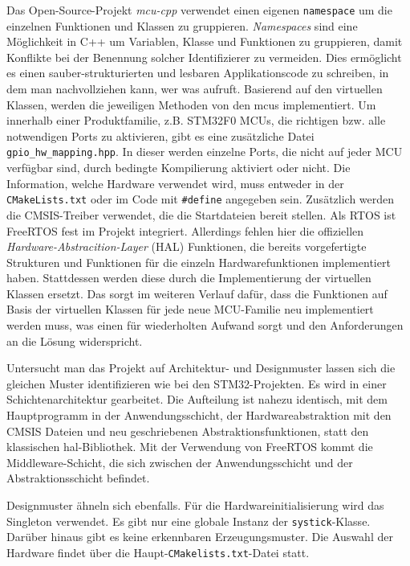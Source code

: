 Das Open-Source-Projekt \emph{mcu-cpp} verwendet einen eigenen \texttt{namespace} um die einzelnen Funktionen und Klassen zu gruppieren.
\emph{Namespaces} sind eine Möglichkeit in C++ um Variablen, Klasse und Funktionen zu gruppieren, damit Konflikte bei der Benennung solcher Identifizierer zu vermeiden.
Dies ermöglicht es einen sauber-strukturierten und lesbaren Applikationscode zu schreiben, in dem man nachvollziehen kann, wer was aufruft.
Basierend auf den virtuellen Klassen, werden die jeweiligen Methoden von den \gls{mcu}s implementiert.
Um innerhalb einer Produktfamilie, z.B. STM32F0 MCUs, die richtigen bzw. alle notwendigen Ports zu aktivieren, gibt es eine zusätzliche Datei \texttt{gpio\_hw\_mapping.hpp}.
In dieser werden einzelne Ports, die nicht auf jeder MCU verfügbar sind, durch bedingte Kompilierung aktiviert oder nicht.
Die Information, welche Hardware verwendet wird, muss entweder in der \texttt{CMakeLists.txt} oder im Code mit \texttt{\#define} angegeben sein.
Zusätzlich werden die CMSIS-Treiber verwendet, die die Startdateien bereit stellen.
Als RTOS ist FreeRTOS fest im Projekt integriert.
Allerdings fehlen hier die offiziellen \emph{Hardware-Abstracition-Layer} (HAL) Funktionen, die bereits vorgefertigte Strukturen und Funktionen für die einzeln Hardwarefunktionen implementiert haben.
Stattdessen werden diese durch die Implementierung der virtuellen Klassen ersetzt.
Das sorgt im weiteren Verlauf dafür, dass die Funktionen auf Basis der virtuellen Klassen für jede neue MCU-Familie neu implementiert werden muss, was einen für wiederholten Aufwand sorgt und den Anforderungen an die Lösung widerspricht.

Untersucht man das Projekt auf Architektur- und Designmuster lassen sich die gleichen Muster identifizieren wie bei den STM32-Projekten.
Es wird in einer Schichtenarchitektur gearbeitet.
Die Aufteilung ist nahezu identisch, mit dem Hauptprogramm in der Anwendungsschicht, der Hardwareabstraktion mit den CMSIS Dateien und neu geschriebenen Abstraktionsfunktionen, statt den klassischen \gls{hal}-Bibliothek.
Mit der Verwendung von FreeRTOS kommt die Middleware-Schicht, die sich zwischen der Anwendungsschicht und der Abstraktionsschicht befindet.

Designmuster ähneln sich ebenfalls.
Für die Hardwareinitialisierung wird das Singleton verwendet.
Es gibt nur eine globale Instanz der \texttt{systick}-Klasse.
Darüber hinaus gibt es keine erkennbaren Erzeugungsmuster.
Die Auswahl der Hardware findet über die Haupt-\texttt{CMakelists.txt}-Datei statt.

